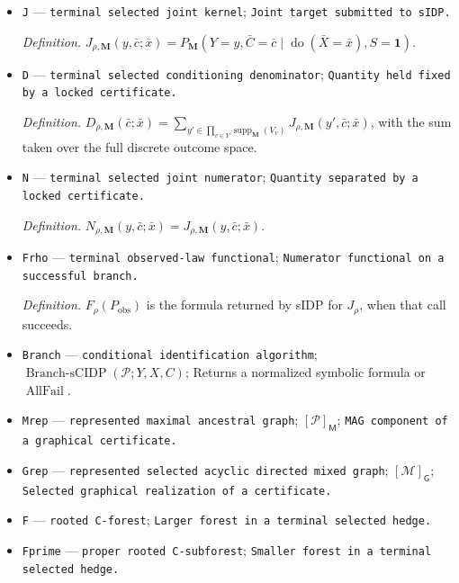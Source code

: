 \documentclass{article}
\begin{document}
\begin{itemize}
  \par\smallskip\noindent\emph{Definition.} \texttt{The complete no-\allowbreak{}selection conditional-\allowbreak{}PAG algorithm of Jaber-\allowbreak{}-\allowbreak{}Ribeiro-\allowbreak{}-\allowbreak{}Zhang-\allowbreak{}-\allowbreak{}Bareinboim.}
  \item \texttt{J} --- \texttt{terminal selected joint kernel}; \texttt{Joint target submitted to sIDP.}
  \par\smallskip\noindent\emph{Definition.} \(J_{\rho,\mathbf M}(y,\bar c;\bar x)=P_{\mathbf M}(Y=y,\bar C=\bar c\mid\operatorname{do}(\bar X=\bar x),S=\mathbf 1)\).
  \item \texttt{D} --- \texttt{terminal selected conditioning denominator}; \texttt{Quantity held fixed by a locked certificate.}
  \par\smallskip\noindent\emph{Definition.} \(D_{\rho,\mathbf M}(\bar c;\bar x)=\sum_{y'\in\prod_{v\in Y}\operatorname{supp}_{\mathbf M}(V_v)}J_{\rho,\mathbf M}(y',\bar c;\bar x)\), with the sum taken over the full discrete outcome space.
  \item \texttt{N} --- \texttt{terminal selected joint numerator}; \texttt{Quantity separated by a locked certificate.}
  \par\smallskip\noindent\emph{Definition.} \(N_{\rho,\mathbf M}(y,\bar c;\bar x)=J_{\rho,\mathbf M}(y,\bar c;\bar x)\).
  \item \texttt{Frho} --- \texttt{terminal observed-\allowbreak{}law functional}; \texttt{Numerator functional on a successful branch.}
  \par\smallskip\noindent\emph{Definition.} \(F_{\rho}(P_{\mathrm{obs}})\) is the formula returned by sIDP for \(J_{\rho}\), when that call succeeds.
  \item \texttt{Branch} --- \texttt{conditional identification algorithm}; \(\operatorname{Branch\text{-}sCIDP}(\mathcal P;Y,X,C)\); Returns a normalized symbolic formula or \(\operatorname{AllFail}\).
  \item \texttt{Mrep} --- \texttt{represented maximal ancestral graph}; \([\mathcal P]_{\mathsf M}\); \texttt{MAG component of a graphical certificate.}
  \item \texttt{Grep} --- \texttt{represented selected acyclic directed mixed graph}; \([\mathcal M]_{\mathsf G}\); \texttt{Selected graphical realization of a certificate.}
  \item \texttt{F} --- \texttt{rooted C-\allowbreak{}forest}; \texttt{Larger forest in a terminal selected hedge.}
  \item \texttt{Fprime} --- \texttt{proper rooted C-\allowbreak{}subforest}; \texttt{Smaller forest in a terminal selected hedge.}

\end{itemize}
\end{document}
